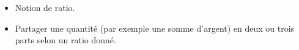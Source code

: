 \begin{prerequis}    
    \begin{itemize}
        \item[\emoji{red-heart}] Notion de ratio.
        \columnbreak
        \item[\emoji{diamond-suit}] Partager une quantité (par exemple une somme d’argent) en deux ou trois parts selon un ratio donné.
     \end{itemize}
\end{prerequis}